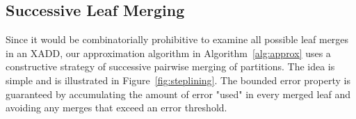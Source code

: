 \subsection{Successive Leaf Merging}

Since it would be combinatorially prohibitive to examine all possible
leaf merges in an XADD, our approximation algorithm in
Algorithm~\ref{alg:approx} uses a constructive strategy of successive
pairwise merging of partitions. The idea is simple and is illustrated
in Figure~\ref{fig:steplining}. The bounded error property is
guaranteed by accumulating the amount of error "used" in every merged
leaf and avoiding any merges that exceed an error threshold.

\begin{figure}[t!]
\centering
\end{figure}
